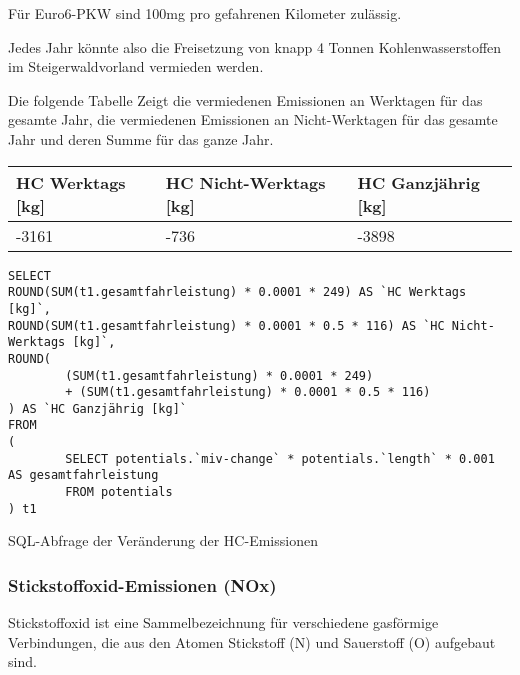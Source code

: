 \documentclass[fontsize=12pt,a4paper]{scrreprt}
\begin{document}
\vspace{1em}

Für Euro6-PKW sind 100mg pro gefahrenen Kilometer zulässig.

\vspace{1em}

Jedes Jahr könnte also die Freisetzung von knapp 4 Tonnen Kohlenwasserstoffen im Steigerwaldvorland vermieden werden.

\vspace{1em}

Die folgende Tabelle Zeigt die vermiedenen Emissionen an Werktagen für das gesamte Jahr, die vermiedenen Emissionen an Nicht-Werktagen für das gesamte Jahr und deren Summe für das ganze Jahr.

\vspace{1em}

\begin{tabular}{|l|l|l|}
        \hline
        HC Werktags [kg] & HC Nicht-Werktags [kg] & HC Ganzjährig [kg] \\
        \hline
        -3161            & -736                   & -3898              \\
        \hline
\end{tabular}

\begin{listing}[htbp]
        \begin{verbatim}
SELECT 
ROUND(SUM(t1.gesamtfahrleistung) * 0.0001 * 249) AS `HC Werktags [kg]`, 
ROUND(SUM(t1.gesamtfahrleistung) * 0.0001 * 0.5 * 116) AS `HC Nicht-Werktags [kg]`, 
ROUND(
        (SUM(t1.gesamtfahrleistung) * 0.0001 * 249) 
        + (SUM(t1.gesamtfahrleistung) * 0.0001 * 0.5 * 116)
) AS `HC Ganzjährig [kg]`
FROM
(
        SELECT potentials.`miv-change` * potentials.`length` * 0.001 AS gesamtfahrleistung
        FROM potentials
) t1
\end{verbatim}
        \caption{SQL-Abfrage der Veränderung der HC-Emissionen}\label{lst-emmissionen-hc}
\end{listing}

\subsubsection{Stickstoffoxid-Emissionen (NOx)}

Stickstoffoxid ist eine Sammelbezeichnung für verschiedene gasförmige Verbindungen, die aus den Atomen Stickstoff (N) und Sauerstoff (O) aufgebaut sind.

\vspace{1em}
\end{document}
